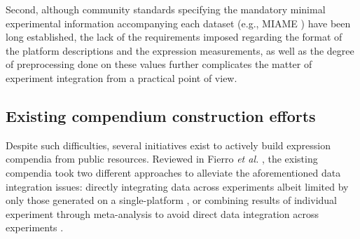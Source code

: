 %
%
Second, although community standards specifying the mandatory minimal
experimental information accompanying each dataset (e.g., MIAME
\cite{Brazma2001}) have been long established, the lack of the requirements
\cite{Brazma2009} imposed regarding the format of the platform descriptions and
the expression measurements, as well as the degree of preprocessing done on
these values further complicates the matter of experiment integration from a
practical point of view.
%




\subsection{Existing compendium construction efforts}

Despite such difficulties, several initiatives exist to actively build
expression compendia from public resources.
%
Reviewed in Fierro \textit{et al.} \cite{Fierro2008}, the existing compendia
took two different approaches to alleviate the aforementioned data integration
issues: directly integrating data across experiments albeit limited by only
those generated on a single-platform \cite{Faith2008, Hruz2008}, or combining
results of individual experiment through meta-analysis to avoid direct data
integration across experiments \cite{Rhodes2007, Pan2007, Elfilali2006,
  Kapushesky2010, Culhane2012}.



